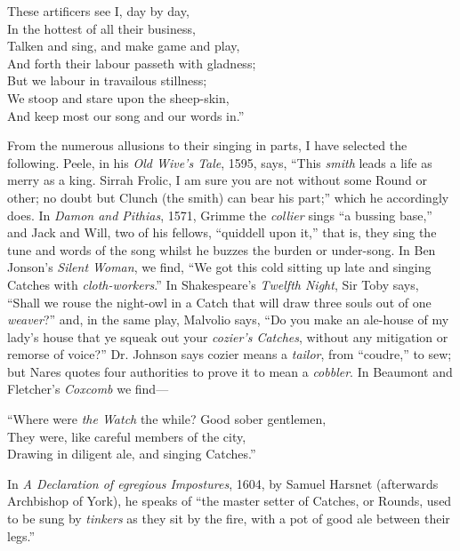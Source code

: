 \begin{scverse}
These artificers see I, day by day,\\
In the hottest of all their business,\\
Talken and sing, and make game and play,\\
And forth their labour passeth with gladness;\\
But we labour in travailous stillness;\\
We stoop and stare upon the sheep-skin,\\
And keep most our song and our words in.”
\end{scverse}

From the numerous allusions to their singing in parts, I have selected the
following. Peele, in his \textit{Old Wive’s Tale}, 1595, says, “This \textit{smith} leads a life as
merry as a king. Sirrah Frolic, I am sure you are not without some Round or
other; no doubt but Clunch (the smith) can bear his part;” which he accordingly
does. In \textit{Damon and Pithias}, 1571, Grimme the \textit{collier} sings “a bussing base,”
and Jack and Will, two of his fellows, “quiddell upon it,” that is, they sing the
tune and words of the song whilst he buzzes the burden or under-song. In Ben
Jonson’s \textit{Silent Woman}, we find, “We got this cold sitting up late and singing
Catches with \textit{cloth-workers}.” In Shakespeare’s \textit{Twelfth Night}, Sir Toby says,
“Shall we rouse the night-owl in a Catch that will draw three souls out of one
\textit{weaver}?” and, in the same play, Malvolio says, “Do you make an ale-house of
my lady’s house that ye squeak out your \textit{cozier’s Catches}, without any mitigation
or remorse of voice?” \pagebreak Dr. Johnson says cozier  means a \textit{tailor}, from “coudre,”
to sew; but Nares quotes four authorities to prove it to mean a \textit{cobbler}. In
Beaumont and Fletcher’s \textit{Coxcomb} we find—

\begin{scverse}
“Where were \textit{the Watch} the while? Good sober gentlemen,\\
They were, like careful members of the city,\\
Drawing in diligent ale, and singing Catches.”
\end{scverse}

In \textit{A Declaration of egregious Impostures}, 1604, by Samuel Harsnet (afterwards
Archbishop of York), he speaks of “the master setter of Catches, or Rounds,
used to be sung by \textit{tinkers} as they sit by the fire, with a pot of good ale between
their legs.”

